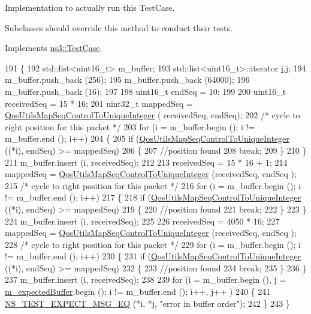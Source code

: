 Implementation to actually run this Test\+Case. 

Subclasses should override this method to conduct their tests. 

Implements \hyperlink{classns3_1_1TestCase_a8ff74680cf017ed42011e4be51917a24}{ns3\+::\+Test\+Case}.


\begin{DoxyCode}
191 \{
192   std::list<uint16\_t> m\_buffer;
193   std::list<uint16\_t>::iterator \hyperlink{bernuolliDistribution_8m_a6f6ccfcf58b31cb6412107d9d5281426}{i},j;
194   m\_buffer.push\_back (256);
195   m\_buffer.push\_back (64000);
196   m\_buffer.push\_back (16);
197 
198   uint16\_t endSeq = 10;
199 
200   uint16\_t receivedSeq = 15 * 16;
201   uint32\_t mappedSeq = \hyperlink{group__wifi_ga841296fae895cac77a0e14183b8134e0}{QosUtilsMapSeqControlToUniqueInteger} (
      receivedSeq, endSeq);
202   \textcolor{comment}{/* cycle to right position for this packet */}
203   \textcolor{keywordflow}{for} (i = m\_buffer.begin (); i != m\_buffer.end (); i++)
204     \{
205       \textcolor{keywordflow}{if} (\hyperlink{group__wifi_ga841296fae895cac77a0e14183b8134e0}{QosUtilsMapSeqControlToUniqueInteger} ((*i), endSeq) >= 
      mappedSeq)
206         \{
207           \textcolor{comment}{//position found}
208           \textcolor{keywordflow}{break};
209         \}
210     \}
211   m\_buffer.insert (i, receivedSeq);
212 
213   receivedSeq = 15 * 16 + 1;
214   mappedSeq = \hyperlink{group__wifi_ga841296fae895cac77a0e14183b8134e0}{QosUtilsMapSeqControlToUniqueInteger} (receivedSeq, endSeq
      );
215   \textcolor{comment}{/* cycle to right position for this packet */}
216   \textcolor{keywordflow}{for} (i = m\_buffer.begin (); i != m\_buffer.end (); i++)
217     \{
218       \textcolor{keywordflow}{if} (\hyperlink{group__wifi_ga841296fae895cac77a0e14183b8134e0}{QosUtilsMapSeqControlToUniqueInteger} ((*i), endSeq) >= 
      mappedSeq)
219         \{
220           \textcolor{comment}{//position found}
221           \textcolor{keywordflow}{break};
222         \}
223     \}
224   m\_buffer.insert (i, receivedSeq);
225 
226   receivedSeq = 4050 * 16;
227   mappedSeq = \hyperlink{group__wifi_ga841296fae895cac77a0e14183b8134e0}{QosUtilsMapSeqControlToUniqueInteger} (receivedSeq, endSeq
      );
228   \textcolor{comment}{/* cycle to right position for this packet */}
229   \textcolor{keywordflow}{for} (i = m\_buffer.begin (); i != m\_buffer.end (); i++)
230     \{
231       \textcolor{keywordflow}{if} (\hyperlink{group__wifi_ga841296fae895cac77a0e14183b8134e0}{QosUtilsMapSeqControlToUniqueInteger} ((*i), endSeq) >= 
      mappedSeq)
232         \{
233           \textcolor{comment}{//position found}
234           \textcolor{keywordflow}{break};
235         \}
236     \}
237   m\_buffer.insert (i, receivedSeq);
238 
239   \textcolor{keywordflow}{for} (i = m\_buffer.begin (), j = \hyperlink{classPacketBufferingCaseB_a7ce5b33bdce1f08d8996fed97295f138}{m\_expectedBuffer}.begin (); i != m\_buffer.end (); i++, j++
      )
240     \{
241       \hyperlink{group__testing_ga7304ba46a28d8cf08dfdfd6499cf7068}{NS\_TEST\_EXPECT\_MSG\_EQ} (*i, *j, \textcolor{stringliteral}{"error in buffer order"});
242     \}
243 \}
\end{DoxyCode}


